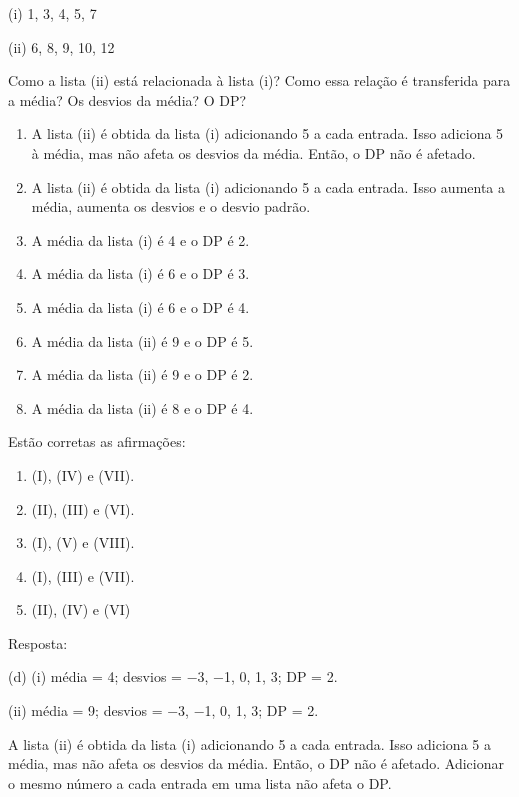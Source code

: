 \documentclass[12pt]{article}\documentclass[brazilian,12pt,a4paper,final]{article}
\begin{document}
\begin{enumerate}
(i) 1, 3, 4, 5, 7

(ii) 6, 8, 9, 10, 12

Como a lista (ii) está relacionada à lista (i)? Como essa relação é transferida para a
média? Os desvios da média? O DP?

\begin{enumerate}[label=(\Roman*)]

\item A lista (ii) é obtida da lista (i) adicionando 5 a cada entrada. Isso adiciona 5 à
média, mas não afeta os desvios da média. Então, o DP não é afetado.

\item A lista (ii) é obtida da lista (i) adicionando 5 a cada entrada. Isso aumenta a média, aumenta os desvios e o desvio padrão.

\item A média da lista (i) é 4 e o DP é 2.

\item A média da lista (i) é 6 e o DP é 3.

\item A média da lista (i) é 6 e o DP é 4.

\item A média da lista (ii) é 9 e o DP é 5.

\item A média da lista (ii) é 9 e o DP é 2.

\item A média da lista (ii) é 8 e o DP é 4.
\end{enumerate}

Estão corretas as afirmações:

\begin{enumerate}
    \item (I), (IV) e (VII).
    \item (II), (III) e (VI).
    \item (I), (V) e (VIII). 
    \item (I), (III) e (VII).
    \item (II), (IV) e (VI)
\end{enumerate}
Resposta:

(d) (i) média = 4; desvios = −3, −1, 0, 1, 3; DP = 2.

(ii) média = 9; desvios = −3, −1, 0, 1, 3; DP = 2.

 A lista (ii) é obtida da lista (i) adicionando 5 a cada entrada. Isso adiciona 5 a
média, mas não afeta os desvios da média. Então, o DP não é afetado. Adicionar o mesmo número a cada entrada em uma lista não afeta o DP.


\end{enumerate}
\end{document}

